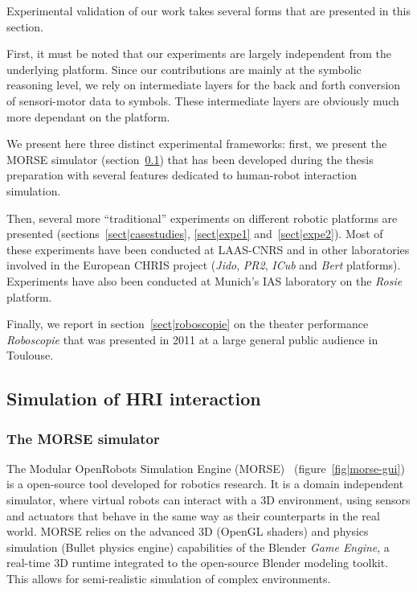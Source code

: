 Experimental validation of our work takes several forms that are presented in
this section.

First, it must be noted that our experiments are largely independent from the
underlying platform. Since our contributions are mainly at the symbolic
reasoning level, we rely on intermediate layers for the back and forth
conversion of sensori-motor data to symbols. These intermediate layers are
obviously much more dependant on the platform.

We present here three distinct experimental frameworks: first, we present the
MORSE simulator (section~\ref{sect|simulation}) that has been developed during
the thesis preparation with several features dedicated to human-robot
interaction simulation.

Then, several more ``traditional'' experiments on different robotic platforms
are presented (sections~\ref{sect|casestudies}, \ref{sect|expe1}
and~\ref{sect|expe2}). Most of these experiments have been conducted at
LAAS-CNRS and in other laboratories involved in the European CHRIS project
(\emph{Jido}, \emph{PR2}, \emph{ICub} and \emph{Bert} platforms).  Experiments
have also been conducted at Munich's IAS laboratory on the \emph{Rosie}
platform.

Finally, we report in section~\ref{sect|roboscopie} on the theater performance
\emph{Roboscopie} that was presented in 2011 at a large general public audience
in Toulouse.

\subsection{Simulation of HRI interaction}
\label{sect|simulation}

\subsubsection{The MORSE simulator}

The Modular OpenRobots Simulation Engine (MORSE)~\cite{Echeverria2011}
(figure~\ref{fig|morse-gui}) is a open-source tool developed for robotics
research. It is a domain independent simulator, where virtual robots can
interact with a 3D environment, using sensors and actuators that behave in the
same way as their counterparts in the real world.  MORSE relies on the advanced
3D (OpenGL shaders) and physics simulation ({\sc Bullet} physics engine)
capabilities of the Blender \emph{Game Engine}, a real-time 3D runtime
integrated to the open-source Blender modeling toolkit.  This allows for
semi-realistic simulation of complex environments.

